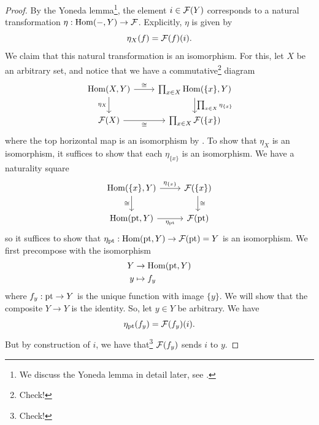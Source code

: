 \begin{proof}
    By the Yoneda lemma\footnote{We discuss the Yoneda lemma in detail later, see .}, the element $i \in \cal{F}(Y)$ corresponds to a natural transformation $\eta : \Hom({-},Y) \to \cal{F}$. Explicitly, $\eta$ is given by
    \[\eta_X(f) = \cal{F}(f)(i).\]
    We claim that this natural transformation is an isomorphism. For this, let $X$ be an arbitrary set, and notice that we have a commutative\footnote{Check!} diagram
    \[\begin{tikzcd}[ampersand replacement=\&]
            {\Hom(X,Y)} \& {\prod_{x \in X} \Hom(\{x\},Y)} \\
            {\cal{F}(X)} \& {\prod_{x \in X} \cal{F}(\{x\})}
            \arrow["\cong", from=1-1, to=1-2]
            \arrow["{\eta_X}"', from=1-1, to=2-1]
            \arrow["{\prod_{x \in X} \eta_{\{x\}}}", from=1-2, to=2-2]
            \arrow["\cong"', from=2-1, to=2-2]
        \end{tikzcd}\]
    where the top horizontal map is an isomorphism by . To show that $\eta_X$ is an isomorphism, it suffices to show that each $\eta_{\{x\}}$ is an isomorphism. We have a naturality square
    \[\begin{tikzcd}[ampersand replacement=\&]
            {\Hom(\{x\},Y)} \& {\cal{F}(\{x\})} \\
            {\Hom(\pt,Y)} \& {\cal{F}(\pt)}
            \arrow["{\eta_{\{x\}}}", from=1-1, to=1-2]
            \arrow["\cong"', from=1-1, to=2-1]
            \arrow["\cong", from=1-2, to=2-2]
            \arrow["{\eta_{\pt}}"', from=2-1, to=2-2]
        \end{tikzcd}\]
    so it suffices to show that $\eta_{\pt} : \Hom(\pt,Y) \to \cal{F}(\pt) = Y$ is an isomorphism. We first precompose with the isomorphism
    \begin{align*}
        Y & \to \Hom(\pt,Y) \\
        y & \mapsto f_y
    \end{align*}
    where $f_y : \pt \to Y$ is the unique function with image $\{y\}$. We will show that the composite $Y \to Y$ is the identity. So, let $y \in Y$ be arbitrary. We have
    \[\eta_\pt(f_y) = \cal{F}(f_y)(i).\]
    But by construction of $i$, we have that\footnote{Check!} $\cal{F}(f_y)$ sends $i$ to $y$.
\end{proof}

